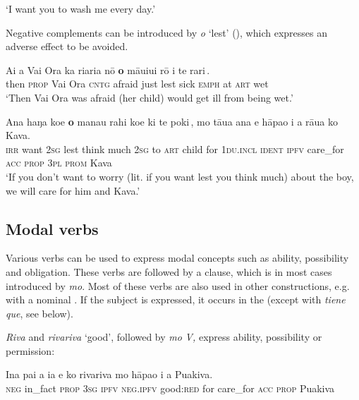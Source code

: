 \glt 
‘I want you to wash me every day.’ \textstyleExampleref{[R313.178]} 
\z

Negative complements can be introduced by \textit{{\ꞌ}o} ‘lest’ (), which expresses an adverse effect to be avoided.

\ea\label{ex:11.75}
\gll {\ꞌ}Ai a Vai Ora ka ri{\ꞌ}ari{\ꞌ}a nō {\ob}\textbf{{\ꞌ}o} māuiui rō {\ꞌ}i te rari\,{\cb}. \\
then \textsc{prop} Vai Ora \textsc{cntg} afraid just {\db}lest sick \textsc{emph} at \textsc{art} wet \\

\glt 
‘Then Vai Ora was afraid (her child) would get ill from being wet.’ \textstyleExampleref{[R301.151]} 
\z

\ea\label{ex:11.76}
\gll Ana haŋa koe {\ob}\textbf{{\ꞌ}o} mana{\ꞌ}u rahi koe ki te poki\,{\cb}, mo tāua {\ꞌ}ana  e hāpa{\ꞌ}o i a rāua ko Kava.\\
\textsc{irr} want \textsc{2sg} {\db}lest think much \textsc{2sg} to \textsc{art} child for \textsc{1du.incl} \textsc{ident}  \textsc{ipfv} care\_for \textsc{acc} \textsc{prop} \textsc{3pl} \textsc{prom} Kava\\

\glt 
‘If you don’t want to worry (lit. if you want lest you think much) about the boy, we will care for him and Kava.’ \textstyleExampleref{[R229.028]} 
\z
{}
\subsection{Modal verbs}\label{sec:11.3.6}
Various verbs can be used to express modal concepts such as ability, possibility and obligation. These verbs are followed by a  clause, which is in most cases introduced by \textit{mo}. Most of these verbs are also used in other constructions, e.g. with a nominal . If the subject is expressed, it occurs in the  (except with \textit{tiene que}, see below).

\textit{Riva} and \textit{rivariva} ‘good’, followed by \textit{mo} \textit{V,} express ability, possibility or permission:

\ea\label{ex:11.77}
\gll {\ꞌ}Ina pa{\ꞌ}i a ia e ko rivariva mo hāpa{\ꞌ}o i a Puakiva. \\
\textsc{neg} in\_fact \textsc{prop} \textsc{3sg} \textsc{ipfv} \textsc{neg.ipfv} good:\textsc{red} for care\_for \textsc{acc} \textsc{prop} Puakiva \\

